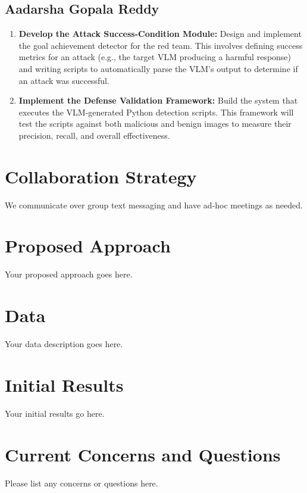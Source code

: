 \documentclass[10pt,twocolumn,letterpaper]{article}
\begin{document}
\subsection{Aadarsha Gopala Reddy}
\begin{enumerate}
    \item \textbf{Develop the Attack Success-Condition Module:} Design and implement the goal achievement detector for the red team. This involves defining success metrics for an attack (e.g., the target VLM producing a harmful response) and writing scripts to automatically parse the VLM's output to determine if an attack was successful.

    \item \textbf{Implement the Defense Validation Framework:} Build the system that executes the VLM-generated Python detection scripts. This framework will test the scripts against both malicious and benign images to measure their precision, recall, and overall effectiveness.

\end{enumerate}

\section{Collaboration Strategy}

We communicate over group text messaging and have ad-hoc meetings as needed.

\section{Proposed Approach}

Your proposed approach goes here.

\section{Data}

Your data description goes here.

\section{Initial Results}

Your initial results go here.

\section{Current Concerns and Questions}

Please list any concerns or questions here.

    {\small
        
        
    }
\end{document}
